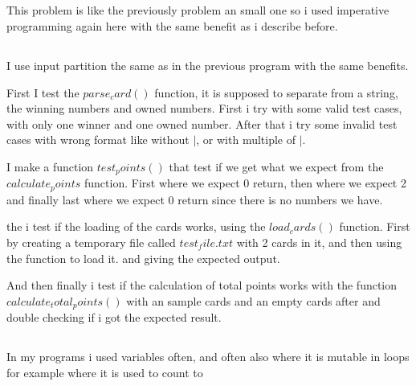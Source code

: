 \documentclass{article}
\begin{document}
\subsection{}




\subsection{}

This problem is like the previously problem an small one so i used imperative programming again here with the same benefit as i describe before. 



\subsection{}
 I use input partition the same as in the previous program with the same benefits. 

First I test the $parse_card()$ function, it is supposed to separate from a string, the winning numbers and owned numbers. First i try with some valid test cases, with only one winner and one owned number. After that i try some invalid test cases with wrong format like without $|$, or with multiple of $|$.

I make a function $test_points()$ that test if we get what we expect from the $calculate_points$ function. First where we expect 0 return, then where we expect 2 and finally last where we expect 0 return since there is no numbers we have.

the i test if the loading of the cards works, using the $load_cards()$ function. First by creating a temporary file called $test_file.txt$ with 2 cards in it, and then using the function to load it. and giving the expected output.

And then finally  i test if the calculation of total points works with the function $calculate_total_points()$ with an sample cards and an empty cards after and double checking if i got the expected result.

\subsection{}

In my programs i used variables often, and often also where it is mutable in loops for example where it is used to count to
\end{document}

